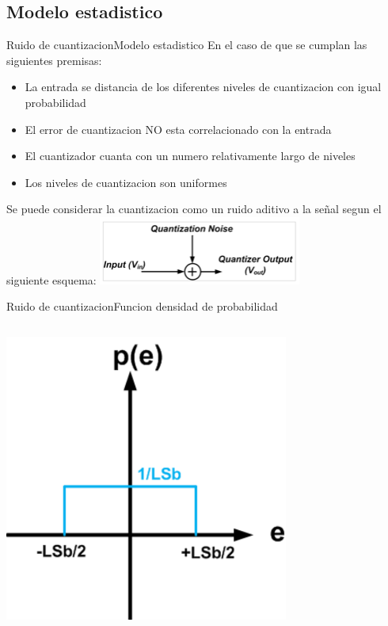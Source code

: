 \begin{darkframes}
      \subsection{Modelo estadistico}
      \begin{frame}{Ruido de cuantizacion}{Modelo estadistico}
         En el caso de que se cumplan las siguientes premisas:
         \begin{itemize}
                \item La entrada se distancia de los diferentes niveles de cuantizacion con igual probabilidad
                \item El error de cuantizacion NO esta correlacionado con la entrada
                \item El cuantizador cuanta con un numero relativamente largo de niveles
                \item Los niveles de cuantizacion son uniformes
         \end{itemize}
            Se puede considerar la cuantizacion como un ruido aditivo a la señal segun el siguiente esquema:
      \center\includegraphics[width=0.5\textwidth]{1_clase/noise_model}
      \vfill
   \end{frame}
   \begin{frame}{Ruido de cuantizacion}{Funcion densidad de probabilidad}
      \begin{columns}[onlytextwidth]
         \center\includegraphics[width=0.7\textwidth]{1_clase/noise_funcion_probabilidad}

\end{columns}
\end{frame}
\end{darkframes}
